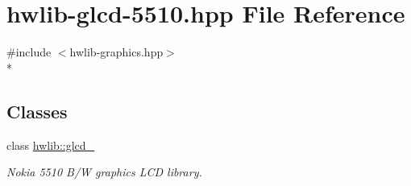 \hypertarget{hwlib-glcd-5510_8hpp}{}\section{hwlib-\/glcd-\/5510.hpp File Reference}
\label{hwlib-glcd-5510_8hpp}
{\ttfamily \#include $<$hwlib-\/graphics.\+hpp$>$}\\*
\subsection*{Classes}
\begin{DoxyCompactItemize}
\item 
class \hyperlink{classhwlib_1_1glcd__5510}{hwlib\+::glcd\+\_}
\begin{DoxyCompactList}\small\item\em Nokia 5510 B/W graphics L\+CD library. \end{DoxyCompactList}\end{DoxyCompactItemize}
